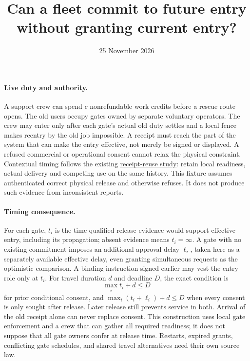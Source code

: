 \documentclass[11pt]{article}
\title{Can a fleet commit to future entry without granting current entry?}
\date{25 November 2026}
\begin{document}
\maketitle
\paragraph{Live duty and authority.}
A support crew can spend \(c\) nonrefundable work credits before a rescue route opens. The old users occupy gates owned by separate voluntary operators. The crew may enter only after each gate's actual old duty settles and a local fence makes reentry by the old job impossible. A receipt must reach the part of the system that can make the entry effective, not merely be signed or displayed. A refused commercial or operational consent cannot relax the physical constraint. Contextual timing follows the existing \href{https://github.com/eternal-november/eos-research-programmes/blob/5003ee534aadd3614868022c93961029d19333e3/projects/byzantine-control/portability/HANDOFF-RECEIPT-REUSE.md}{receipt-reuse study}: retain local readiness, actual delivery and competing use on the same history. This fixture assumes authenticated correct physical release and otherwise refuses. It does not produce such evidence from inconsistent reports.
\paragraph{Timing consequence.}
For each gate, \(t_i\) is the time qualified release evidence would support effective entry, including its propagation; absent evidence means \(t_i=\infty\). A gate with no existing commitment imposes an additional approval delay \(\ell_i\), taken here as a separately available effective delay, even granting simultaneous requests as the optimistic comparison. A binding instruction signed earlier may vest the entry role only at \(t_i\). For travel duration \(d\) and deadline \(D\), the exact condition is
\[
 \max_i t_i + d\le D
\]
for prior conditional consent, and \(\max_i(t_i+\ell_i)+d\le D\) when every consent is only sought after release. Later release still prevents service in both. Arrival of the old receipt alone can never replace consent. This construction uses local gate enforcement and a crew that can gather all required readiness; it does not suppose that all gate owners confer at release time. Restarts, expired grants, conflicting gate schedules, and shared travel alternatives need their own source law.
\end{document}
